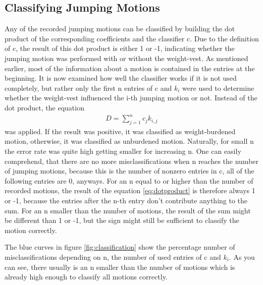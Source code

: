 \documentclass[a4paper]{article}
\begin{document}
\subsection{Classifying Jumping Motions}

Any of the recorded jumping motions can be classified by building the dot product of the corresponding coefficients and the classifier c.
Due to the definition of c, the result of this dot product is either 1 or -1, indicating whether the jumping motion was performed with or without the weight-vest.
As mentioned earlier, most of the information about a motion is contained in the entries at the beginning.
It is now examined how well the classifier works if it is not used completely, but rather only the first n entries of c and $k_{i}$ were used to determine whether the weight-vest influenced the i-th jumping motion or not.
Instead of the dot product, the equation
\begin{align}
	D=\sum\limits_{j=1}^n c_{j} k_{i,j} \label{eq:dotproduct}
\end{align} 
was applied. If the result was positive, it was classified as weight-burdened motion, otherwise, it was classified as unburdened motion.
Naturally, for small n the error rate was quite high getting smaller for increasing n.
One can easily comprehend, that there are no more misclassifications when n reaches the number of jumping motions, because this is the number of nonzero entries in c, all of the following entries are 0, anyways.
For an n equal to or higher than the number of recorded motions, the result of the equation \ref{eq:dotproduct} is therefore always 1 or -1, because the entries after the n-th entry don't contribute anything to the sum.
For an n smaller than the number of motions, the result of the sum might be different than 1 or -1, but the sign might still be sufficient to classify the motion correctly.

The blue curves in figure \ref{fig:classification} show the percentage number of misclassifications depending on n, the number of used entries of c and $k_{i}$. As you can see, there usually is an n smaller than the number of motions which is already high enough to classify all motions correctly.
\end{document}
